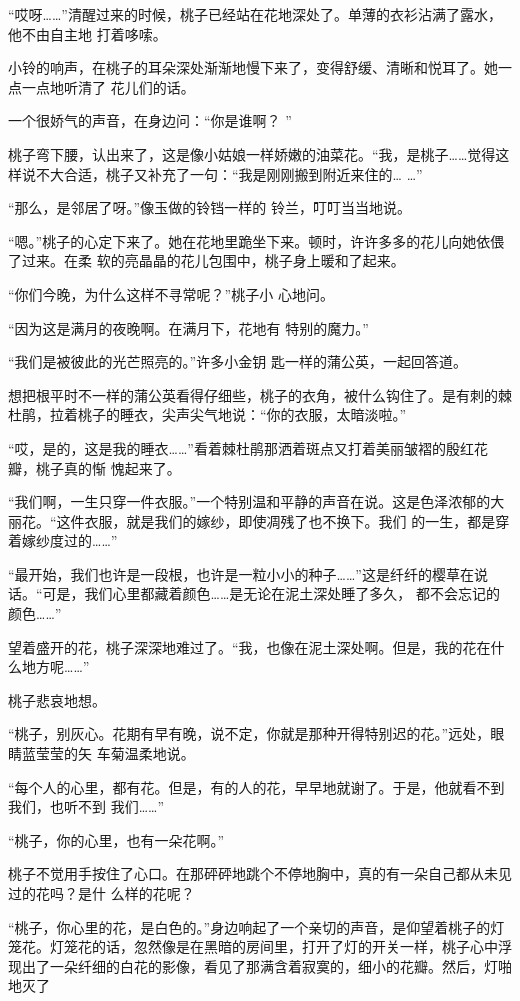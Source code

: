 \documentclass{article}
\begin{document}
“哎呀……”清醒过来的时候，桃子已经站在花地深处了。单薄的衣衫沾满了露水，他不由自主地
打着哆嗦。 

小铃的响声，在桃子的耳朵深处渐渐地慢下来了，变得舒缓、清晰和悦耳了。她一点一点地听清了
花儿们的话。 

一个很娇气的声音，在身边问：“你是谁啊？
” 

\newpage

桃子弯下腰，认出来了，这是像小姑娘一样娇嫩的油菜花。“我，是桃子……觉得这样说不大合适，桃子又补充了一句：“我是刚刚搬到附近来住的…
…” 

“那么，是邻居了呀。”像玉做的铃铛一样的
铃兰，叮叮当当地说。 

“嗯。”桃子的心定下来了。她在花地里跪坐下来。顿时，许许多多的花儿向她依偎了过来。在柔
软的亮晶晶的花儿包围中，桃子身上暖和了起来。 

“你们今晚，为什么这样不寻常呢？”桃子小
心地问。 

“因为这是满月的夜晚啊。在满月下，花地有
特别的魔力。” 

“我们是被彼此的光芒照亮的。”许多小金钥
匙一样的蒲公英，一起回答道。 

\newpage

想把根平时不一样的蒲公英看得仔细些，桃子的衣角，被什么钩住了。是有刺的棘杜鹃，拉着桃子的睡衣，尖声尖气地说：“你的衣服，太暗淡啦。”

“哎，是的，这是我的睡衣……”看着棘杜鹃那洒着斑点又打着美丽皱褶的殷红花瓣，桃子真的惭
愧起来了。 

“我们啊，一生只穿一件衣服。”一个特别温和平静的声音在说。这是色泽浓郁的大丽花。“这件衣服，就是我们的嫁纱，即使凋残了也不换下。我们
的一生，都是穿着嫁纱度过的……” 

“最开始，我们也许是一段根，也许是一粒小小的种子……”这是纤纤的樱草在说话。“可是，我们心里都藏着颜色……是无论在泥土深处睡了多久，
都不会忘记的颜色……” 

望着盛开的花，桃子深深地难过了。“我，也像在泥土深处啊。但是，我的花在什么地方呢……”

\newpage
桃子悲哀地想。 

“桃子，别灰心。花期有早有晚，说不定，你就是那种开得特别迟的花。”远处，眼睛蓝莹莹的矢
车菊温柔地说。 

“每个人的心里，都有花。但是，有的人的花，早早地就谢了。于是，他就看不到我们，也听不到
我们……” 


“桃子，你的心里，也有一朵花啊。” 

桃子不觉用手按住了心口。在那砰砰地跳个不停地胸中，真的有一朵自己都从未见过的花吗？是什
么样的花呢？ 

“桃子，你心里的花，是白色的。”身边响起了一个亲切的声音，是仰望着桃子的灯笼花。灯笼花的话，忽然像是在黑暗的房间里，打开了灯的开关一样，桃子心中浮现出了一朵纤细的白花的影像，看见了那满含着寂寞的，细小的花瓣。然后，灯啪地灭了
\end{document}
